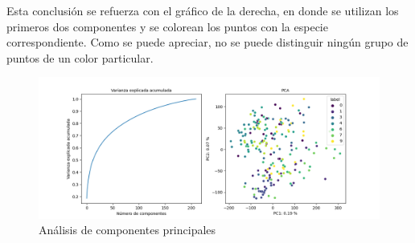 \documentclass{article}
\begin{document}
Esta conclusión se refuerza con el gráfico de la derecha, en donde se utilizan
los primeros dos componentes y se colorean los puntos con la especie correspondiente.
Como se puede apreciar, no se puede distinguir ningún grupo de puntos de un color
particular.

\begin{figure}[h!]
  \centering    
  \includegraphics[width=1\textwidth]{9_1_pca.png}
  \caption{Análisis de componentes principales}
\end{figure}

\end{document}
